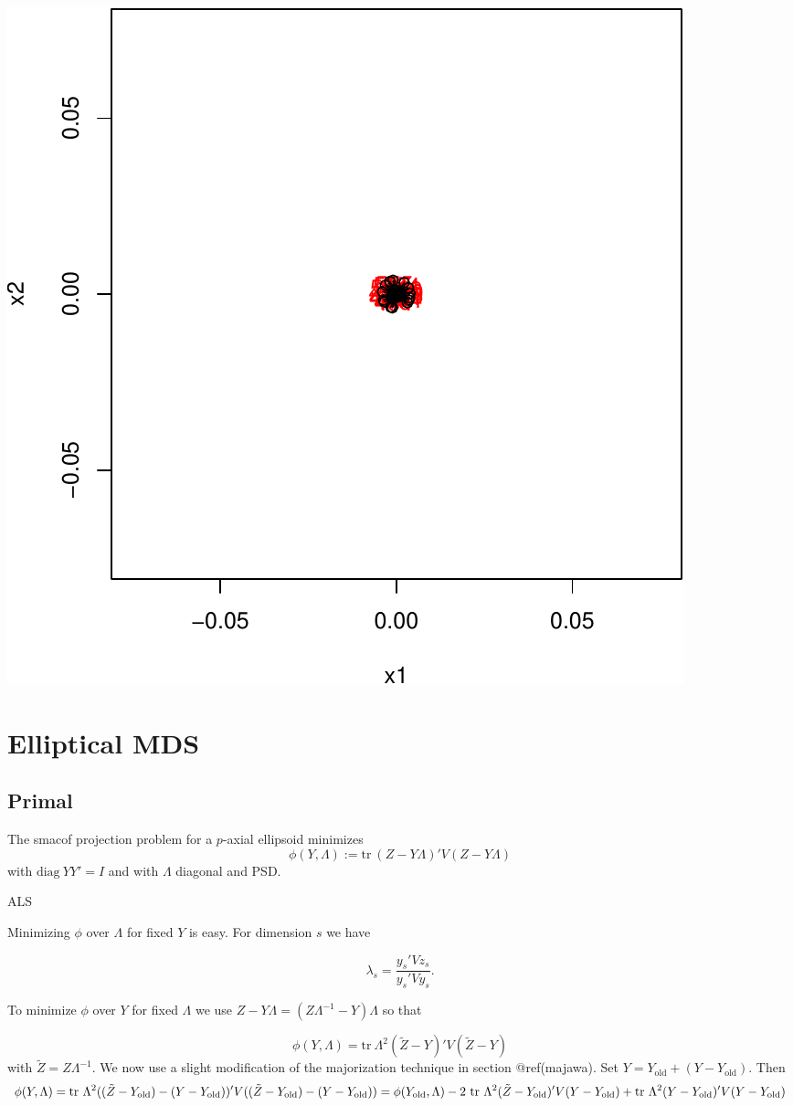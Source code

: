 \documentclass[
  12pt,
  letterpaper,
  DIV=11,
  numbers=noendperiod]{scrreprt}
\theoremstyle{remark}
\begin{document}
\begin{center}
\includegraphics{constrained_files/figure-pdf/plcircpnts-1.pdf}
\end{center}

\section{Elliptical MDS}\label{ellimcds}

\subsection{Primal}\label{elliprimal}

The smacof projection problem for a \(p\)-axial ellipsoid minimizes \[
\phi(Y,\Lambda):=\text{tr}\ (Z-Y\Lambda)'V(Z-Y\Lambda)
\] with \(\text{diag}\ YY'=I\) and with \(\Lambda\) diagonal and PSD.

ALS

Minimizing \(\phi\) over \(\Lambda\) for fixed \(Y\) is easy. For
dimension \(s\) we have

\[
\lambda_s=\frac{y_s'Vz_s}{y_s'Vy_s}.
\]

To minimize \(\phi\) over \(Y\) for fixed \(\Lambda\) we use
\(Z-Y\Lambda=(Z\Lambda^{-1}-Y)\Lambda\) so that

\[
\phi(Y,\Lambda)=\text{tr}\ \Lambda^2(\tilde Z-Y)'V(\tilde Z-Y)
\] with \(\tilde Z=Z\Lambda^{-1}\). We now use a slight modification of
the majorization technique in section @ref(majawa). Set
\(Y=Y_{\text{old}}+(Y-Y_{\text{old}})\). Then \[
\phi(Y,\Lambda)=\text{tr}\ \Lambda^2((\tilde Z-Y_{\text{old}})-(Y-Y_{\text{old}}))'V((\tilde Z-Y_{\text{old}})-(Y-Y_{\text{old}}))=\\
\phi(Y_{\text{old}},\Lambda)-2\ \text{tr}\ \Lambda^2(\tilde Z-Y_{\text{old}})'V(Y-Y_{\text{old}})+\text{tr}\ \Lambda^2(Y-Y_{\text{old}})'V(Y-Y_{\text{old}})
\]
\end{document}

